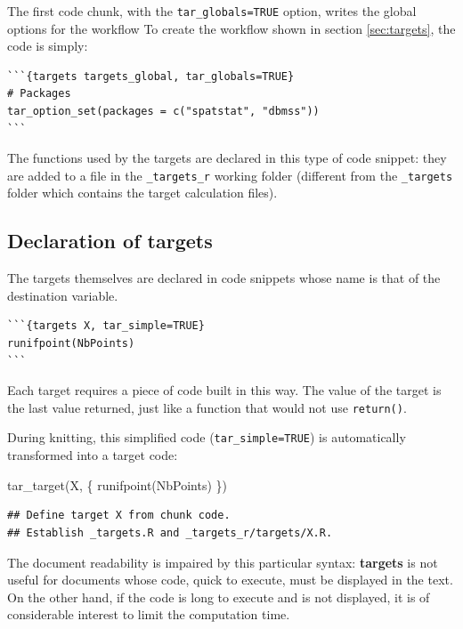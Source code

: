 \documentclass[
  12pt,
  american,
  a4paper,
  extrafontsizes,onecolumn,openright
  ]{memoir}
\newenvironment{Shaded}{\begin{snugshade}}{\end{snugshade}}
\newcommand{\FunctionTok}[1]{\textcolor[rgb]{0.00,0.00,0.00}{#1}}
\newcommand{\NormalTok}[1]{#1}
\begin{document}
The first code chunk, with the \texttt{tar\_globals=TRUE} option, writes the global options for the workflow
To create the workflow shown in section \ref{sec:targets}, the code is simply:

\begin{verbatim}
```{targets targets_global, tar_globals=TRUE}
# Packages
tar_option_set(packages = c("spatstat", "dbmss"))
```
\end{verbatim}

The functions used by the targets are declared in this type of code snippet: they are added to a file in the \texttt{\_targets\_r} working folder (different from the \texttt{\_targets} folder which contains the target calculation files).

\hypertarget{declaration-of-targets}{%
\subsection{Declaration of targets}\label{declaration-of-targets}}

The targets themselves are declared in code snippets whose name is that of the destination variable.

\begin{verbatim}
```{targets X, tar_simple=TRUE}
runifpoint(NbPoints)
```
\end{verbatim}

Each target requires a piece of code built in this way.
The value of the target is the last value returned, just like a function that would not use \texttt{return()}.

During knitting, this simplified code (\texttt{tar\_simple=TRUE}) is automatically transformed into a target code:

\scriptsize

\begin{Shaded}
\begin{Highlighting}[]
\FunctionTok{tar\_target}\NormalTok{(X, \{}
  \FunctionTok{runifpoint}\NormalTok{(NbPoints)}
\NormalTok{\})}
\end{Highlighting}
\end{Shaded}

\begin{verbatim}
## Define target X from chunk code.
## Establish _targets.R and _targets_r/targets/X.R.
\end{verbatim}

\normalsize

The document readability is impaired by this particular syntax: \textbf{targets} is not useful for documents whose code, quick to execute, must be displayed in the text.
On the other hand, if the code is long to execute and is not displayed, it is of considerable interest to limit the computation time.
\end{document}
